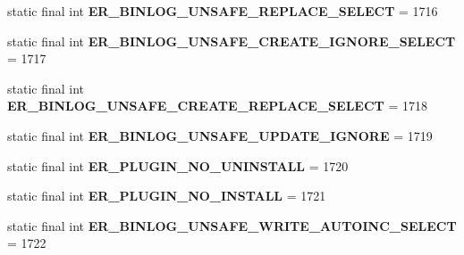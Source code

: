 \begin{DoxyCompactItemize}
static final int {\bfseries E\+R\+\_\+\+B\+I\+N\+L\+O\+G\+\_\+\+U\+N\+S\+A\+F\+E\+\_\+\+R\+E\+P\+L\+A\+C\+E\+\_\+\+S\+E\+L\+E\+CT} = 1716
\item 
\mbox{\label{classcom_1_1mysql_1_1jdbc_1_1_mysql_error_numbers_a74204e8a1877a6996292a1af7aac1132}} 
static final int {\bfseries E\+R\+\_\+\+B\+I\+N\+L\+O\+G\+\_\+\+U\+N\+S\+A\+F\+E\+\_\+\+C\+R\+E\+A\+T\+E\+\_\+\+I\+G\+N\+O\+R\+E\+\_\+\+S\+E\+L\+E\+CT} = 1717
\item 
\mbox{\label{classcom_1_1mysql_1_1jdbc_1_1_mysql_error_numbers_a6ae87d7bd1b4216d8f816e18df426ab4}} 
static final int {\bfseries E\+R\+\_\+\+B\+I\+N\+L\+O\+G\+\_\+\+U\+N\+S\+A\+F\+E\+\_\+\+C\+R\+E\+A\+T\+E\+\_\+\+R\+E\+P\+L\+A\+C\+E\+\_\+\+S\+E\+L\+E\+CT} = 1718
\item 
\mbox{\label{classcom_1_1mysql_1_1jdbc_1_1_mysql_error_numbers_aaa025b109a7ba1fb9539e9a1780d3083}} 
static final int {\bfseries E\+R\+\_\+\+B\+I\+N\+L\+O\+G\+\_\+\+U\+N\+S\+A\+F\+E\+\_\+\+U\+P\+D\+A\+T\+E\+\_\+\+I\+G\+N\+O\+RE} = 1719
\item 
\mbox{\label{classcom_1_1mysql_1_1jdbc_1_1_mysql_error_numbers_aa8ee7d78a8ffef217a5e8319d62b46f7}} 
static final int {\bfseries E\+R\+\_\+\+P\+L\+U\+G\+I\+N\+\_\+\+N\+O\+\_\+\+U\+N\+I\+N\+S\+T\+A\+LL} = 1720
\item 
\mbox{\label{classcom_1_1mysql_1_1jdbc_1_1_mysql_error_numbers_a2f6407c46e3d8d3dd4228c2945e5a396}} 
static final int {\bfseries E\+R\+\_\+\+P\+L\+U\+G\+I\+N\+\_\+\+N\+O\+\_\+\+I\+N\+S\+T\+A\+LL} = 1721
\item 
\mbox{\label{classcom_1_1mysql_1_1jdbc_1_1_mysql_error_numbers_a539c6ad460be6c04aa18c897b5aa267c}} 
static final int {\bfseries E\+R\+\_\+\+B\+I\+N\+L\+O\+G\+\_\+\+U\+N\+S\+A\+F\+E\+\_\+\+W\+R\+I\+T\+E\+\_\+\+A\+U\+T\+O\+I\+N\+C\+\_\+\+S\+E\+L\+E\+CT} = 1722
\item 
\mbox{\label{classcom_1_1mysql_1_1jdbc_1_1_mysql_error_numbers_a179056adafeba100dff421af0484df97}} 

\end{DoxyCompactItemize}

